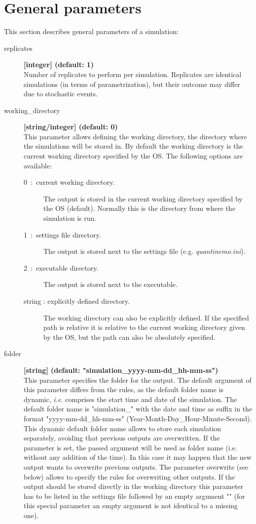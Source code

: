 \documentclass[letterpaper,12pt,oneside]{book}
\begin{document}
\chapter{General parameters}\label{chap:GeneralParameters}
This section describes general parameters of a simulation: 
\begin{description}

 
\item[replicates]\textbf{[integer] (default: 1)}\\
Number of replicates to perform per simulation. Replicates are identical simulations (in terms of parametrization), but their outcome may differ due to stochastic events. 

\item[working\_directory]\textbf{[string/integer] (default: 0)}\\
This parameter allows defining the working directory, the directory where the simulations will be stored in. By default the working directory is the current working directory specified by the OS. The following options are available:
\begin{description}
\item[0~:~current working directory.] The output is stored in the current working directory specified by the OS (default). Normally this is the directory from where the simulation is run. 
\item[1~:~settings file directory.] The output is stored next to the settings file (e.g. \textit{quantinemo.ini}).
\item[2~:~executable directory.] The output is stored next to the executable.  
\item[string : explicitly defined directory.] The working directory can also be explicitly defined. If the specified path is relative it is relative to the current working directory given by the OS, but the path can also be absolutely specified.
\end{description}


\item[folder]\textbf{[string] (default: "simulation\_yyyy-mm-dd\_hh-mm-ss")}\\
This parameter specifies the folder for the output. The default argument of this parameter differs from the rules, as the default folder name is dynamic, \textit{i.e.} comprises the start time and date of the simulation. The default folder name is "simulation\_" with the date and time as suffix in the format "yyyy-mm-dd\_hh-mm-ss" (Year-Month-Day\_Hour-Minute-Second). This dynamic default folder name allows to store each simulation separately, avoiding that previous outputs are overwritten. If the parameter is set, the passed argument will be used as folder name (i.e. without any addition of the time). In this case it may happen that the new output wants to overwrite previous outputs. The parameter \textsf{overwrite} (see below) allows to specify the rules for overwriting other outputs. If the output should be stored directly in the working directory this parameter has to be listed in the settings file followed by an empty argument "" (for this special parameter an empty argument is not identical to a missing one).


\end{description}
\end{document}
